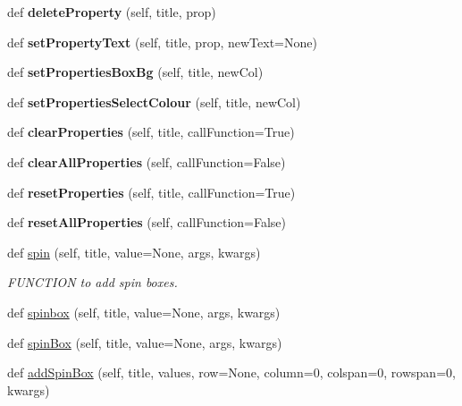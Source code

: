 \begin{DoxyCompactItemize}
def {\bfseries delete\+Property} (self, title, prop)
\item 
\mbox{\label{classappjar_1_1gui_a133d2a042129b3c6a5079eceb4936527}} 
def {\bfseries set\+Property\+Text} (self, title, prop, new\+Text=None)
\item 
\mbox{\label{classappjar_1_1gui_a6e73a032b5d50c136dad903680ae9e1a}} 
def {\bfseries set\+Properties\+Box\+Bg} (self, title, new\+Col)
\item 
\mbox{\label{classappjar_1_1gui_a1625708eb226fbdec03eac570a97a82b}} 
def {\bfseries set\+Properties\+Select\+Colour} (self, title, new\+Col)
\item 
\mbox{\label{classappjar_1_1gui_a2f207e510b3885a33812675731cb7d1b}} 
def {\bfseries clear\+Properties} (self, title, call\+Function=True)
\item 
\mbox{\label{classappjar_1_1gui_a9a27ac33853f6b7b2eae546a9782faae}} 
def {\bfseries clear\+All\+Properties} (self, call\+Function=False)
\item 
\mbox{\label{classappjar_1_1gui_a18e0416d4d15b4d04324a7c669273df7}} 
def {\bfseries reset\+Properties} (self, title, call\+Function=True)
\item 
\mbox{\label{classappjar_1_1gui_a2439b5bb09b05d887fc22a51787050a1}} 
def {\bfseries reset\+All\+Properties} (self, call\+Function=False)
\item 
def \hyperlink{classappjar_1_1gui_a2e3a74c36436276af7a6360a5a290374}{spin} (self, title, value=None, args, kwargs)
\begin{DoxyCompactList}\small\item\em F\+U\+N\+C\+T\+I\+ON to add spin boxes. \end{DoxyCompactList}\item 
def \hyperlink{classappjar_1_1gui_abd6237ace9166a9cd526087aaa16c8a4}{spinbox} (self, title, value=None, args, kwargs)
\item 
def \hyperlink{classappjar_1_1gui_a0f0bbd7063c1509a99084ff40f323d83}{spin\+Box} (self, title, value=None, args, kwargs)
\item 
def \hyperlink{classappjar_1_1gui_a9284aafc1204e8650229c8aea2965da3}{add\+Spin\+Box} (self, title, values, row=None, column=0, colspan=0, rowspan=0, kwargs)

\end{DoxyCompactItemize}
